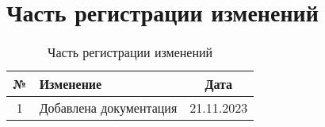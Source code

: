 \section{Часть регистрации изменений}
\begin{table}[h]
  \centering
  \caption{Часть регистрации изменений}
  \begin{tabular}{|c|p{8cm}|c|}
        \hline
        \textbf{№} & \textbf{Изменение}     & \textbf{Дата} \\
        \hline
        1          & Добавлена документация & 21.11.2023    \\
        \hline
  \end{tabular}
\end{table}